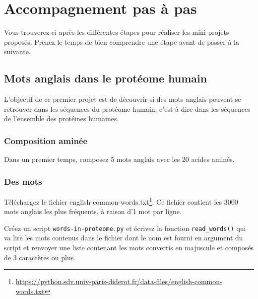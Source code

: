 \documentclass[a4paper,11pt,twoside]{book}
\renewcommand{\href}[2]{#2\footnote{\url{#1}}}
\begin{document}



{
\setcounter{tocdepth}{2}
\tableofcontents
}


\section{Accompagnement pas à pas}\label{accompagnement-pas-uxe0-pas}

Vous trouverez ci-après les différentes étapes pour réaliser les
mini-projets proposés. Prenez le temps de bien comprendre une étape
avant de passer à la suivante.

\subsection{Mots anglais dans le protéome
humain}\label{mots-anglais-dans-le-protuxe9ome-humain}

L'objectif de ce premier projet est de découvrir si des mots anglais
peuvent se retrouver dans les séquences du protéome humain, c'est-à-dire
dans les séquences de l'ensemble des protéines humaines.

\subsubsection{Composition aminée}\label{composition-aminuxe9e}

Dans un premier temps, composez 5 mots anglais avec les 20 acides
aminés.

\subsubsection{Des mots}\label{des-mots}

Téléchargez le fichier
\href{https://python.sdv.univ-paris-diderot.fr/data-files/english-common-words.txt}{english-common-words.txt}.
Ce fichier contient les 3000 mots anglais les plus fréquents, à raison
d'1 mot par ligne.

Créez un script \texttt{words-in-proteome.py} et écrivez la fonction
\texttt{read\_words()} qui va lire les mots contenus dans le fichier
dont le nom est fourni en argument du script et renvoyer une liste
contenant les mots convertis en majuscule et composés de 3 caractères ou
plus.
\end{document}
